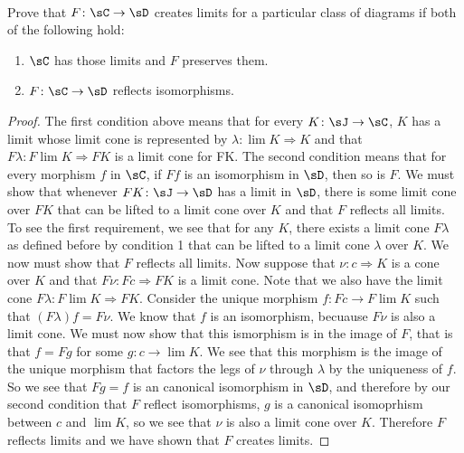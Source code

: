 \documentclass[main.tex]{subfiles}
\begin{document}
\paragraph{}
\begin{exercise}
Prove that $F\colon\sC \rightarrow \sD$ creates limits for a particular class of diagrams if both of the following hold:
\begin{enumerate}
    \item $\sC$ has those limits and $F$ preserves them.
    \item $F\colon \sC \rightarrow \sD$ reflects isomorphisms. 
\end{enumerate}
\end{exercise}

\begin{proof}
The first condition above means that for every $K\colon \sJ \rightarrow \sC$, $K$ has a
limit whose limit cone is represented by $\lambda\colon\lim K \Rightarrow K$ and
that $F\lambda\colon F\lim K \Rightarrow FK$ is a limit cone for FK. The second
condition means that for every morphism $f$ in $\sC$, if $Ff$ is an isomorphism
in $\sD$, then so is $F$. 
We must show that whenever $FK\colon \sJ \rightarrow \sD$ has a limit in $\sD$, there is
some limit cone over $FK$ that can be lifted to a limit cone over $K$ and that
$F$ reflects all limits. To see the first requirement, we see that for any $K$,
there exists a limit cone $F\lambda$ as defined before by condition 1 that can
be lifted to a limit cone $\lambda$ over $K$. We now must show that $F$
reflects all limits. 
Now suppose that $\nu\colon c \Rightarrow K$ is a cone over $K$ and that $F\nu\colon Fc
\Rightarrow FK$ is a limit cone. Note that we also have the limit cone
$F\lambda\colon F\lim K \Rightarrow FK$. Consider the unique morphism $f:Fc
\rightarrow F\lim K$ such that $(F\lambda)f=F\nu$. We know that $f$ is an
isomorphism, becuause $F\nu$ is also a limit cone.  We must now show that this
ismorphism is in the image of $F$, that is that $f = Fg$ for some $g: c
\rightarrow \lim K$. We see that this morphism is the image of the unique
morphism that factors the legs of $\nu$ through $\lambda$ by the uniqueness of
$f$. 
So we see that $Fg = f$ is an canonical isomorphism in $\sD$, and therefore by
our second condition that $F$ reflect isomorphisms, $g$ is a canonical
isomoprhism between $c$ and $\lim K$, so we see that $\nu$ is also a limit cone
over $K$. Therefore $F$ reflects limits and we have shown that $F$ creates
limits. 
\end{proof}
\end{document}
